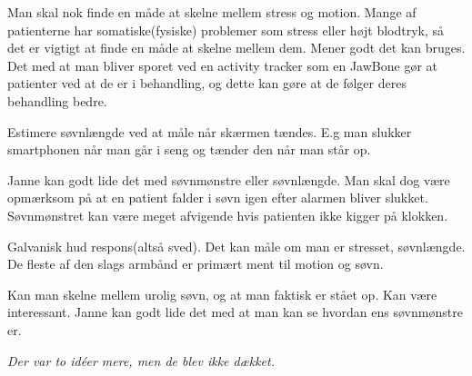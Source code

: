 \begin{description}[style=nextline]
    Man skal nok finde en måde at skelne mellem stress og motion. Mange af patienterne har somatiske(fysiske) problemer som stress eller højt blodtryk, så det er vigtigt at finde en måde at skelne mellem dem. Mener godt det kan bruges. Det med at man bliver sporet ved en activity tracker som en JawBone gør at patienter ved at de er i behandling, og dette kan gøre at de følger deres behandling bedre.
    
\item[Idé 9]
    Estimere søvnlængde ved at måle når skærmen tændes. E.g man slukker smartphonen når man går i seng og tænder den når man står op. 
    
    Janne kan godt lide det med søvnmønstre eller søvnlængde. Man skal dog være opmærksom på at en patient falder i søvn igen efter alarmen bliver slukket. Søvnmønstret kan være meget afvigende hvis patienten ikke kigger på klokken.
\item[Idé 10]
    Galvanisk hud respons(altså sved). Det kan måle om man er stresset, søvnlængde. De fleste af den slags armbånd er primært ment til motion og søvn.
    
    Kan man skelne mellem urolig søvn, og at man faktisk er stået op.
    Kan være interessant. 
    Janne kan godt lide det med at man kan se hvordan ens søvnmønstre er.
\end{description}

\textit{Der var to idéer mere, men de blev ikke dækket.}        